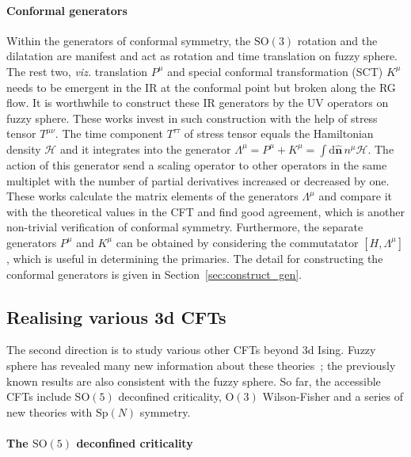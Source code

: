 \documentclass{timesjhep}
\begin{document}
\paragraph{Conformal generators~\cite{Fardelli2024,Fan2024}}

Within the generators of conformal symmetry, the $\mathrm{SO}(3)$ rotation and the dilatation are manifest and act as rotation and time translation on fuzzy sphere. The rest two, \textit{viz.} translation $P^\mu$ and special conformal transformation (SCT) $K^\mu$ needs to be emergent in the IR at the conformal point but broken along the RG flow. It is worthwhile to construct these IR generators by the UV operators on fuzzy sphere. These works invest in such construction with the help of stress tensor $T^{\mu\nu}$. The time component $T^{\tau\tau}$ of stress tensor equals the Hamiltonian density $\mathcal{H}$ and it integrates into the generator $\Lambda^\mu=P^\mu+K^\mu=\int\mathrm{d}\hat{\mathbf{n}}\,n^\mu\mathcal{H}$. The action of this generator send a scaling operator to other operators in the same multiplet with the number of partial derivatives increased or decreased by one. These works calculate the matrix elements of the generators $\Lambda^\mu$ and compare it with the theoretical values in the CFT and find good agreement, which is another non-trivial verification of conformal symmetry. Furthermore, the separate generators $P^\mu$ and $K^\mu$ can be obtained by considering the commutatator $[H,\Lambda^\mu]$, which is useful in determining the primaries. The detail for constructing the conformal generators is given in Section~\ref{sec:construct_gen}.

\subsection{Realising various 3d CFTs}

The second direction is to study various other CFTs beyond 3d Ising. Fuzzy sphere has revealed many new information about these theories~; the previously known results are also consistent with the fuzzy sphere. So far, the accessible CFTs include $\mathrm{SO}(5)$ deconfined criticality, $\mathrm{O}(3)$ Wilson-Fisher and a series of new theories with $\mathrm{Sp}(N)$ symmetry. 

\paragraph{The $\mathrm{SO}(5)$ deconfined criticality~\cite{Zhou2023}}
\end{document}
